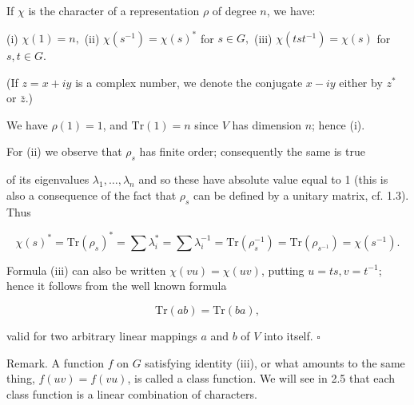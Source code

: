 If $\chi$ is the character of a representation $\rho$ of degree $n$, we have:

(i) $\chi(1) = n,$
(ii) $\chi(s^{-1}) = \chi(s)^*$ for $s \in G,$
(iii) $\chi(tst^{-1}) = \chi(s)$ for $s, t \in G.$

(If $z = x + iy$ is a complex number, we denote the conjugate $x - iy$ either by $z^*$ or $\bar{z}$.)

We have $\rho(1) = 1$, and $\text{Tr}(1) = n$ since $V$ has dimension $n$; hence (i).

For (ii) we observe that $\rho_s$ has finite order; consequently the same is true

of its eigenvalues $\lambda_1, \ldots, \lambda_n$ and so these have absolute value equal to 1 (this is also a consequence of the fact that $\rho_s$ can be defined by a unitary matrix, cf. 1.3). Thus

$$\chi(s)^* = \text{Tr}(\rho_s)^* = \sum \lambda_i^* = \sum \lambda_i^{-1} = \text{Tr}(\rho_s^{-1}) = \text{Tr}(\rho_{s^{-1}}) = \chi(s^{-1}).$$

Formula (iii) can also be written $\chi(vu) = \chi(uv)$, putting $u = ts, v = t^{-1}$; hence it follows from the well known formula

$$\text{Tr}(ab) = \text{Tr}(ba),$$

valid for two arbitrary linear mappings $a$ and $b$ of $V$ into itself. $\square$

Remark. A function $f$ on $G$ satisfying identity (iii), or what amounts to the same thing, $f(uv) = f(vu)$, is called a class function. We will see in 2.5 that each class function is a linear combination of characters.
